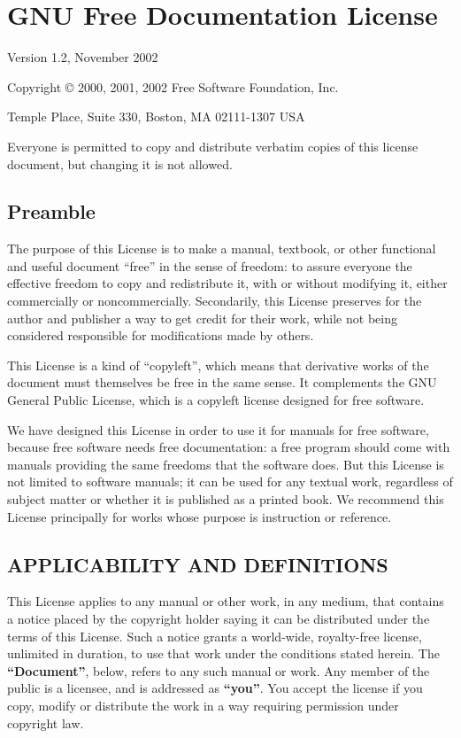 \chapter{GNU Free Documentation License}
\begin{center}
 Version 1.2, November 2002\par
 Copyright \copyright{} 2000, 2001, 2002 Free Software Foundation, Inc.\par
  Temple Place, Suite 330, Boston, MA 02111-1307 USA\par
 \medskip
 Everyone is permitted to copy and distribute verbatim copies of this license document,
 but changing it is not allowed.
\end{center}

\section*{Preamble}
The purpose of this License is to make a manual, textbook, or other functional and useful
document ``free'' in the sense of freedom: to assure everyone the effective freedom to copy and
redistribute it, with or without modifying it, either commercially or noncommercially.
Secondarily, this License preserves for the author and publisher a way to get credit for their work,
while not being considered responsible for modifications made by others.

This License is a kind of ``copyleft'', which means that derivative works of the document
must themselves be free in the same sense. It complements the GNU General Public License,
which is a copyleft license designed for free software.

We have designed this License in order to use it for manuals for free software, because free
software needs free documentation: a free program should come with manuals providing the
same freedoms that the software does. But this License is not limited to software manuals; it
can be used for any textual work, regardless of subject matter or whether it is published as a
printed book. We recommend this License principally for works whose purpose is instruction or
reference.


\section{APPLICABILITY AND DEFINITIONS}
This License applies to any manual or other work, in any medium, that contains a notice placed
by the copyright holder saying it can be distributed under the terms of this License. Such a
notice grants a world-wide, royalty-free license, unlimited in duration, to use that work under
the conditions stated herein. The \textbf{``Document''}, below, refers to any such manual or work.
Any member of the public is a licensee, and is addressed as \textbf{``you''}.
You accept the license if
you copy, modify or distribute the work in a way requiring permission under copyright law.


